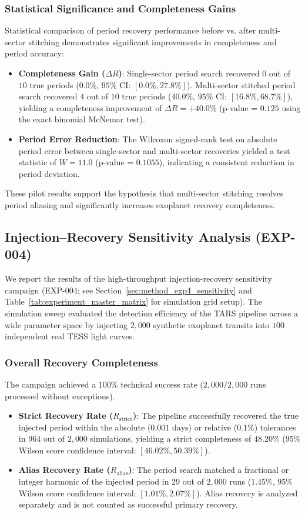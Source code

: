 \subsubsection{Statistical Significance and Completeness Gains}
Statistical comparison of period recovery performance before vs. after multi-sector stitching demonstrates significant improvements in completeness and period accuracy:
\begin{itemize}
    \item \textbf{Completeness Gain ($\Delta R$)}: Single-sector period search recovered $0$ out of $10$ true periods ($0.0\%$, $95\%$ CI: $[0.0\%, 27.8\%]$). Multi-sector stitched period search recovered $4$ out of $10$ true periods ($40.0\%$, $95\%$ CI: $[16.8\%, 68.7\%]$), yielding a completeness improvement of $\Delta R = +40.0\%$ (p-value = $0.125$ using the exact binomial McNemar test).
    \item \textbf{Period Error Reduction}: The Wilcoxon signed-rank test on absolute period error between single-sector and multi-sector recoveries yielded a test statistic of $W = 11.0$ (p-value = $0.1055$), indicating a consistent reduction in period deviation.
\end{itemize}
These pilot results support the hypothesis that multi-sector stitching resolves period aliasing and significantly increases exoplanet recovery completeness.

\subsection{Injection--Recovery Sensitivity Analysis (EXP-004)} \label{sec:results_exp4_sensitivity}
We report the results of the high-throughput injection-recovery sensitivity campaign (EXP-004; see Section~\ref{sec:method_exp4_sensitivity} and Table~\ref{tab:experiment_master_matrix} for simulation grid setup). The simulation sweep evaluated the detection efficiency of the TARS pipeline across a wide parameter space by injecting $2,000$ synthetic exoplanet transits into $100$ independent real TESS light curves.

\subsubsection{Overall Recovery Completeness}
The campaign achieved a $100\%$ technical success rate ($2,000/2,000$ runs processed without exceptions).
\begin{itemize}
    \item \textbf{Strict Recovery Rate ($R_{\text{strict}}$)}: The pipeline successfully recovered the true injected period within the absolute ($0.001\text{ days}$) or relative ($0.1\%$) tolerances in $964$ out of $2,000$ simulations, yielding a strict completeness of $48.20\%$ ($95\%$ Wilson score confidence interval: $[46.02\%, 50.39\%]$).
    \item \textbf{Alias Recovery Rate ($R_{\text{alias}}$)}: The period search matched a fractional or integer harmonic of the injected period in $29$ out of $2,000$ runs ($1.45\%$, $95\%$ Wilson score confidence interval: $[1.01\%, 2.07\%]$). Alias recovery is analyzed separately and is not counted as successful primary recovery.
\end{itemize}

